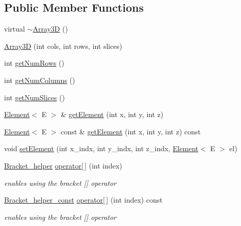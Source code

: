 \subsection*{Public Member Functions}
\begin{DoxyCompactItemize}
\item 
virtual \hyperlink{classbridges_1_1datastructure_1_1_array3_d_afad3212fe6c2954859a7ea6dce7a739c}{$\sim$\+Array3D} ()
\item 
\hyperlink{classbridges_1_1datastructure_1_1_array3_d_afcda227020737d25a23774fc9f1a5259}{Array3D} (int cols, int rows, int slices)
\item 
int \hyperlink{classbridges_1_1datastructure_1_1_array3_d_a73aebe1098512ca4196cb8da0eb493fe}{get\+Num\+Rows} ()
\item 
int \hyperlink{classbridges_1_1datastructure_1_1_array3_d_acbd00c0c4448ff7ff03c76bc0701f602}{get\+Num\+Columns} ()
\item 
int \hyperlink{classbridges_1_1datastructure_1_1_array3_d_ad2fb0a0b8be702944c25b6fc807263f7}{get\+Num\+Slices} ()
\item 
\hyperlink{classbridges_1_1datastructure_1_1_element}{Element}$<$ E $>$ \& \hyperlink{classbridges_1_1datastructure_1_1_array3_d_abfe7d227f22474d78cf83f468d2ee111}{get\+Element} (int x, int y, int z)
\item 
\hyperlink{classbridges_1_1datastructure_1_1_element}{Element}$<$ E $>$ const  \& \hyperlink{classbridges_1_1datastructure_1_1_array3_d_afc99aa28fe5f194af6759fbfdcfd199a}{get\+Element} (int x, int y, int z) const
\item 
void \hyperlink{classbridges_1_1datastructure_1_1_array3_d_aadcfac64b2c3eb242658f94580582c42}{set\+Element} (int x\+\_\+indx, int y\+\_\+indx, int z\+\_\+indx, \hyperlink{classbridges_1_1datastructure_1_1_element}{Element}$<$ E $>$ el)
\item 
\hyperlink{structbridges_1_1datastructure_1_1_array3_d_1_1_bracket__helper}{Bracket\+\_\+helper} \hyperlink{classbridges_1_1datastructure_1_1_array3_d_a0b285b00e5d152d2968bee6b3aaf9349}{operator\mbox{[}$\,$\mbox{]}} (int index)
\begin{DoxyCompactList}\small\item\em enables using the bracket \mbox{[}\mbox{]} operator \end{DoxyCompactList}\item 
\hyperlink{structbridges_1_1datastructure_1_1_array3_d_1_1_bracket__helper__const}{Bracket\+\_\+helper\+\_\+const} \hyperlink{classbridges_1_1datastructure_1_1_array3_d_acfc0446c919e7ca70cc31d0624b3bcd1}{operator\mbox{[}$\,$\mbox{]}} (int index) const
\begin{DoxyCompactList}\small\item\em enables using the bracket \mbox{[}\mbox{]} operator \end{DoxyCompactList}\end{DoxyCompactItemize}
